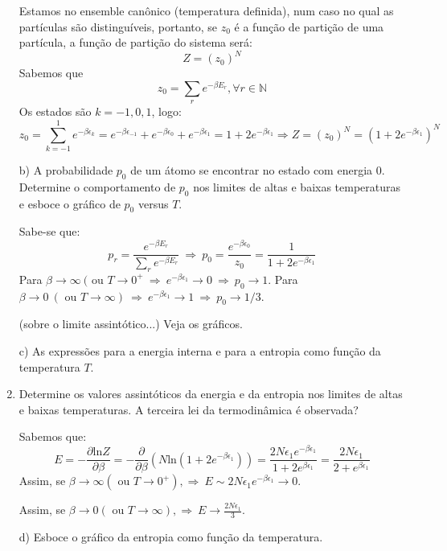\begin{enumerate}[start=1,label={\bfseries Q\arabic*.}]
\resposta Estamos no ensemble canônico (temperatura definida), num caso no qual as partículas são distinguíveis, portanto, se $z_{0}$ é a função de partição de uma partícula, a função de partição do sistema será:
$$
Z = (z_{0})^{N}
$$
Sabemos que
$$
z_{0} = \sum_{r} e^{-\beta E_{r}}, \forall r \in \mathbb{N}
$$
Os estados são $k = -1,0,1$, logo:
$$
z_{0} = \sum_{k=-1}^{1} e^{-\beta \epsilon_{k}} = e^{-\beta \epsilon_{-1}} + e^{-\beta \epsilon_{0}} + e^{-\beta \epsilon_{1}} = 1 + 2 e^{-\beta \epsilon_{1}} \Rightarrow Z = (z_{0})^{N} =  \left( 1  +  2 e^{-\beta \epsilon_{1}} \right)^{N}
$$


b) A probabilidade $p_{0}$ de um átomo se encontrar no estado com energia 0. Determine o comportamento de $p_{0}$ nos limites de altas e baixas temperaturas e esboce o gráfico de $p_{0}$ versus $T$.

\resposta Sabe-se que:
$$
p_{r} = \frac{e^{-\beta E_{r}}}{ \sum_{r} e^{-\beta E_{r}} }  \ \Rightarrow \ p_{0} = \frac{e^{-\beta \epsilon_{0}}}{ z_{0} } = \frac{1}{1+2e^{-\beta \epsilon_{1}}}
$$
Para $\beta \rightarrow \infty \ (\mbox{ ou } T \rightarrow 0^{+} \ \Rightarrow \ e^{ -\beta \epsilon_{1}} \rightarrow 0 \ \Rightarrow \ p_{0} \rightarrow 1$.
Para $\beta \rightarrow 0 \ (\mbox{ ou } T \rightarrow \infty )\ \Rightarrow \ e^{ -\beta \epsilon_{1}} \rightarrow 1 \ \Rightarrow \ p_{0} \rightarrow 1/3$.

(sobre o limite assintótico...) Veja os gráficos.

c) As expressões para a energia interna e para a entropia como função da temperatura $T$.
\item[  ] Determine os valores assintóticos da energia e da entropia nos limites de altas e baixas temperaturas. A terceira lei da termodinâmica é observada?

\resposta Sabemos que:
$$
E = - \frac{\partial \mathrm{ln} Z}{\partial \beta} = - \frac{\partial }{\partial \beta} \left( N \mathrm{ln}\left( 1 + 2 e^{-\beta \epsilon_{1}}   \right) \right) = \frac{2N \epsilon_{1} e^{-\beta \epsilon_{1}}}{1+2e^{\beta \epsilon_{1}}} = \frac{2N\epsilon_{1}}{2+e^{\beta \epsilon_{1}}}
$$
Assim, se $\beta \rightarrow \infty (\mbox{ ou } T \rightarrow 0^{+}), \Rightarrow \ E \sim 2N\epsilon_{1} e^{-\beta \epsilon_{1}} \rightarrow 0$.

Assim, se $\beta \rightarrow 0 (\mbox{ ou } T \rightarrow \infty), \Rightarrow \ E \rightarrow \frac{2 N\epsilon_{1}}{3}$.



d) Esboce o gráfico da entropia como função da temperatura.


\end{enumerate}
